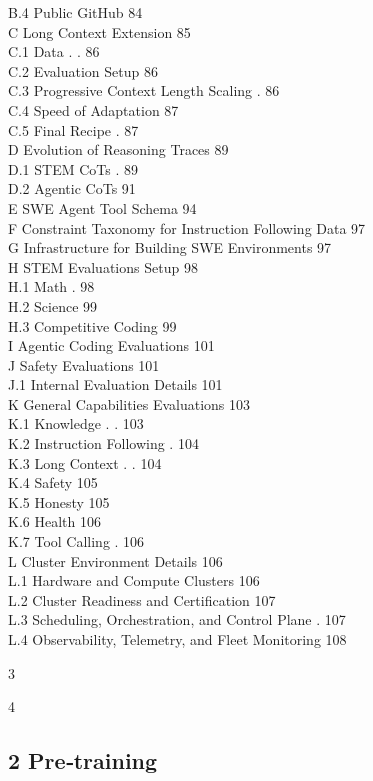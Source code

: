 \documentclass[
  10
]{article}
\begin{document}
B.4 Public GitHub 84\\
C Long Context Extension 85\\
C.1 Data . . 86\\
C.2 Evaluation Setup 86\\
C.3 Progressive Context Length Scaling . 86\\
C.4 Speed of Adaptation 87\\
C.5 Final Recipe . 87\\
D Evolution of Reasoning Traces 89\\
D.1 STEM CoTs . 89\\
D.2 Agentic CoTs 91\\
E SWE Agent Tool Schema 94\\
F Constraint Taxonomy for Instruction Following Data 97\\
G Infrastructure for Building SWE Environments 97\\
H STEM Evaluations Setup 98\\
H.1 Math . 98\\
H.2 Science 99\\
H.3 Competitive Coding 99\\
I Agentic Coding Evaluations 101\\
J Safety Evaluations 101\\
J.1 Internal Evaluation Details 101\\
K General Capabilities Evaluations 103\\
K.1 Knowledge . . 103\\
K.2 Instruction Following . 104\\
K.3 Long Context . . 104\\
K.4 Safety 105\\
K.5 Honesty 105\\
K.6 Health 106\\
K.7 Tool Calling . 106\\
L Cluster Environment Details 106\\
L.1 Hardware and Compute Clusters 106\\
L.2 Cluster Readiness and Certification 107\\
L.3 Scheduling, Orchestration, and Control Plane . 107\\
L.4 Observability, Telemetry, and Fleet Monitoring 108

3

4

\subsection{2 Pre‐training}\label{pretraining}
\end{document}
